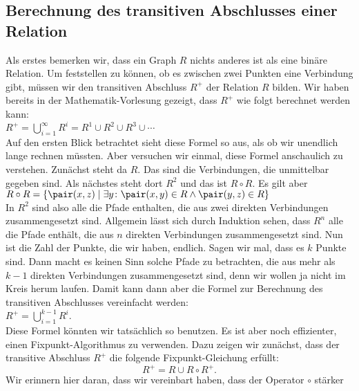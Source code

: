 \subsection{Berechnung des transitiven Abschlusses einer Relation}
Als erstes bemerken wir, dass ein Graph $R$ nichts anderes ist als eine binäre Relation.
Um feststellen zu können, ob es zwischen zwei Punkten eine Verbindung gibt,
müssen wir den transitiven Abschluss $R^+$ der Relation $R$ bilden.  Wir haben bereits
in der Mathematik-Vorlesung gezeigt, dass $R^+$ wie folgt
berechnet werden kann: \\[0.2cm]
\hspace*{1.3cm} $R^+ = \bigcup\limits_{i=1}^{\infty} R^i = R^1 \cup R^2 \cup R^3 \cup \cdots$  \\[0.2cm]
Auf den ersten Blick betrachtet sieht diese Formel so aus, als ob wir unendlich
lange rechnen müssten.  Aber versuchen wir einmal, diese Formel anschaulich zu
verstehen.  Zunächst steht da $R$.  Das sind die Verbindungen, die unmittelbar  gegeben
sind.  Als nächstes steht dort $R^2$ und das ist $R \circ R$.  Es gilt aber \\[0.2cm]
\hspace*{1.3cm} $R \circ R = \{ \pair(x,z) \mid \exists y \colon \pair(x,y) \in R \wedge \pair(y,z) \in R \}$
\\[0.2cm]
In $R^2$ sind also alle die Pfade enthalten, die aus zwei direkten Verbindungen
zusammengesetzt sind.  Allgemein lässt sich durch Induktion sehen, dass $R^n$
alle die Pfade enthält, die aus $n$ direkten Verbindungen zusammengesetzt sind.  Nun
ist die Zahl der Punkte, die wir haben, endlich.  Sagen wir mal, dass es
$k$ Punkte sind.  Dann macht es  keinen Sinn solche Pfade zu betrachten, die
aus mehr als $k-1$ direkten Verbindungen zusammengesetzt sind, denn wir wollen ja
nicht im Kreis herum laufen.  Damit kann dann aber die Formel zur Berechnung des
transitiven Abschlusses vereinfacht werden:\\[0.2cm]
\hspace*{1.3cm} 
$R^+ = \bigcup\limits_{i=1}^{k-1} R^i$.
\\[0.2cm]
Diese Formel könnten wir tatsächlich so benutzen.  Es ist aber noch effizienter,
einen Fixpunkt-Algorithmus zu verwenden.  Dazu zeigen wir zunächst, dass der transitive
Abschluss $R^+$ die folgende Fixpunkt-Gleichung erfüllt:
\begin{equation}
  \label{fixpunkt}
  R^+ = R \cup R \circ R^+. 
\end{equation}
Wir erinnern hier daran, dass wir vereinbart haben, dass der Operator $\circ$ stärker

